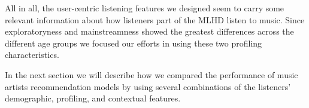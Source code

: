 All in all, the user-centric listening features we designed seem to carry some relevant information about how listeners part of the MLHD listen to music. 
Since exploratoryness and mainstreamness showed the greatest differences across the different age groups we focused our efforts in using these two profiling characteristics.

In the next section we will describe how we compared the performance of music artists recommendation models by using several combinations of the listeners' demographic, profiling, and contextual features.





